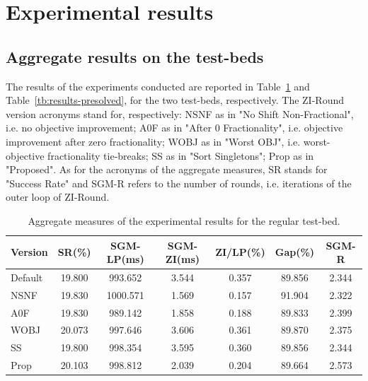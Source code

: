 \documentclass[a4paper,12pt,twoside]{scrbook}
\begin{document}
\section{Experimental results} \label{sec:expresults}

\subsection{Aggregate results on the test-beds}

The results of the experiments conducted are reported in Table~\ref{tb:results-normal} and Table~\ref{tb:results-presolved}, for the two test-beds, respectively. The ZI-Round version acronyms stand for, respectively: NSNF as in "No Shift Non-Fractional", i.e. no objective improvement; A0F as in "After 0 Fractionality", i.e. objective improvement after zero fractionality; WOBJ as in "Worst OBJ", i.e. worst-objective fractionality tie-breaks; SS as in "Sort Singletons"; Prop as in "Proposed". As for the acronyms of the aggregate measures, SR stands for "Success Rate" and SGM-R refers to the number of rounds, i.e. iterations of the outer loop of ZI-Round. \par
\begin{table}[ht]
	\centering
	\begin{tabular}{@{}lcccccc@{}}
	\toprule
	Version  & SR(\%) & SGM-LP(ms) & SGM-ZI(ms) & ZI/LP(\%) & Gap(\%) & SGM-R \\ \midrule
	Default  & 19.800 & 993.652    & 3.544      & 0.357     & 89.856  & 2.344 \\
	NSNF     & 19.830 & 1000.571   & 1.569      & 0.157     & 91.904  & 2.322 \\
	A0F      & 19.830 & 989.142    & 1.858      & 0.188     & 89.833  & 2.399 \\
	WOBJ     & 20.073 & 997.646    & 3.606      & 0.361     & 89.870  & 2.375 \\
	SS       & 19.800 & 998.354    & 3.595      & 0.360     & 89.856  & 2.344 \\
	Prop     & 20.103 & 998.812    & 2.039      & 0.204     & 89.664  & 2.573 \\ \bottomrule
	\end{tabular}
	\caption{Aggregate measures of the experimental results for the regular test-bed.}
	\label{tb:results-normal}
\end{table}
\end{document}

